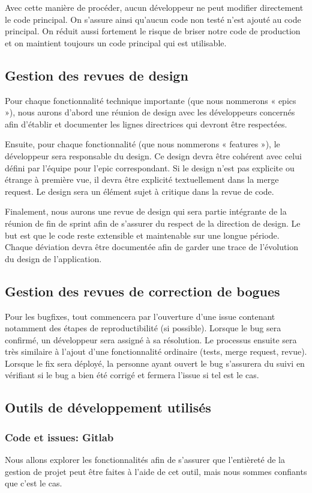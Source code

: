 	Avec cette manière de procéder, aucun développeur ne peut modifier directement le code principal. On s’assure ainsi qu’aucun code non testé n’est ajouté au code principal. On réduit aussi fortement le risque de briser notre code de production et on maintient toujours un code principal qui est utilisable. 
	\subsection{Gestion des revues de design}
	Pour chaque fonctionnalité technique importante (que nous nommerons « epics »), nous aurons d’abord une réunion de design avec les développeurs concernés afin d’établir et documenter les lignes directrices qui devront être respectées. 

	Ensuite, pour chaque fonctionnalité (que nous nommerons « features »), le développeur sera responsable du design. Ce design devra être cohérent avec celui défini par l’équipe pour l’epic correspondant. Si le design n’est pas explicite ou étrange à première vue, il devra être explicité textuellement dans la merge request. Le design sera un élément sujet à critique dans la revue de code. 

	Finalement, nous aurons une revue de design qui sera partie intégrante de la réunion de fin de sprint afin de s’assurer du respect de la direction de design. Le but est que le code reste extensible et maintenable sur une longue période. Chaque déviation devra être documentée afin de garder une trace de l’évolution du design de l'application. 

	\subsection{Gestion des revues de correction de bogues}
	Pour les bugfixes, tout commencera par l’ouverture d’une issue contenant notamment des étapes de reproductibilité (si possible). Lorsque le bug sera confirmé, un développeur sera assigné à sa résolution. Le processus ensuite sera très similaire à l’ajout d’une fonctionnalité ordinaire (tests, merge request, revue). Lorsque le fix sera déployé, la personne ayant ouvert le bug s’assurera du suivi en vérifiant si le bug a bien été corrigé et fermera l’issue si tel est le cas.

	\subsection{Outils de développement utilisés}
		\subsubsection{Code et issues: Gitlab}
		Nous allons explorer les fonctionnalités afin de s’assurer que l’entièreté de la gestion de projet peut être faites à l’aide de cet outil, mais nous sommes confiants que c’est le cas.
		
